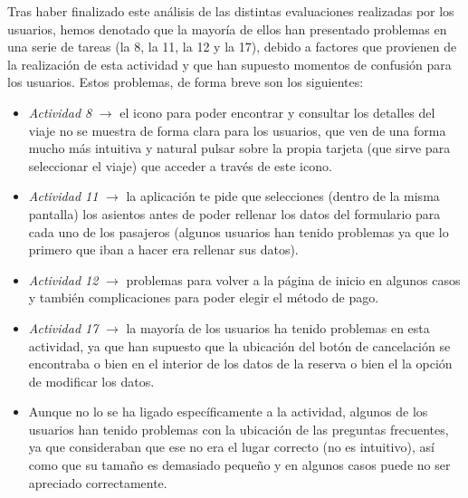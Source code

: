 Tras haber finalizado este análisis de las distintas evaluaciones realizadas por los usuarios, hemos denotado que la mayoría de ellos han presentado problemas en una serie
de tareas (la 8, la 11, la 12 y la 17), debido a factores que provienen de la realización de esta actividad y que han supuesto momentos de confusión para los usuarios. Estos problemas,
de forma breve son los siguientes:
\begin{itemize}
    \item \textit{Actividad 8} $\rightarrow$ el icono para poder encontrar y consultar los detalles del viaje no se muestra de forma clara para los usuarios, que ven de una forma mucho
    más intuitiva y natural pulsar sobre la propia tarjeta (que sirve para seleccionar el viaje) que acceder a través de este icono.
    \item \textit{Actividad 11} $\rightarrow$ la aplicación te pide que selecciones (dentro de la misma pantalla) los asientos antes de poder rellenar los datos del formulario para cada
    uno de los pasajeros (algunos usuarios han tenido problemas ya que lo primero que iban a hacer era rellenar sus datos).
    \item \textit{Actividad 12} $\rightarrow$ problemas para volver a la página de inicio en algunos casos y también complicaciones para poder elegir el método de pago.
    \item \textit{Actividad 17} $\rightarrow$ la mayoría de los usuarios ha tenido problemas en esta actividad, ya que han supuesto que la ubicación del botón de cancelación
    se encontraba o bien en el interior de los datos de la reserva o bien el la opción de modificar los datos.
    \item Aunque no lo se ha ligado específicamente a la actividad, algunos de los usuarios han tenido problemas con la ubicación de las preguntas frecuentes, ya que consideraban que ese no era
    el lugar correcto (no es intuitivo), así como que su tamaño es demasiado pequeño y en algunos casos puede no ser apreciado correctamente.
\end{itemize}